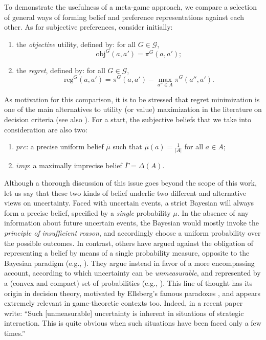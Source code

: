 \documentclass[fleqn,reqno,12pt]{article}
\theoremstyle{Satz}
\theoremstyle{Bsp}
\begin{document}
To demonstrate the usefulness of a meta-game approach, we compare a
selection of general ways of forming belief and preference representations against each
other. As for subjective preferences, consider initially:
\begin{enumerate}
\item the \textit{objective} utility, defined by: for all $G \in \mathcal{G}$,
$$\text{obj}^G(a,a')=\pi^G(a,a');$$
\item the \textit{regret}, defined by: for all $G \in \mathcal{G}$,
$$\text{reg}^G(a,a') =\pi^G(a,a')- \max_{a''\in A} \pi^G(a'',a').$$
\end{enumerate}

As motivation for this comparison, it is to be stressed that regret minimization is one of the main alternatives to utility (or value) maximization in the literature on decision criteria (see also \cite{bleWakker15}).
For a start, the subjective beliefs that we take into consideration are also two:
\begin{enumerate}
\item $prc$: a precise uniform belief $\overline{\mu}$ such that $\overline{\mu}(a)=\frac{1}{|A|}$ for all $a\in A$;
\item $imp$: a maximally imprecise belief $\overline{\Gamma}=\Delta(A)$.
\end{enumerate}

Although a thorough discussion of this issue goes beyond the scope of this work, let us say
that these two kinds of belief underlie two different and alternative views on
uncertainty. Faced with uncertain events, a strict Bayesian will always form a precise belief,
specified by a \textit{single} probability $\mu$. In the absence of any information about
future uncertain events, the Bayesian would mostly invoke the \textit{principle of insufficient
  reason}, and accordingly choose a uniform probability over the possible outcomes. In
contrast, others have argued against the obligation of representing a belief by means of a
single probability measure, opposite to the Bayesian paradigm (e.g., \cite{GilbMarin13}). They
argue instead in favor of a more encompassing account, according to which uncertainty can be
\emph{unmeasurable}, and represented by a (convex and compact) set of probabilities (e.g.,
\cite{gilsch89}). This line of thought has its origin in decision theory, motivated by
Ellsberg's famous paradoxes \citep{ells61}, and appears extremely relevant in game-theoretic
contexts too. Indeed, in a recent paper \citet{BattCerrMM15} write: ``Such [unmeasurable] uncertainty is inherent in situations of strategic interaction. This is quite obvious
  when such situations have been faced only a few times.''
\end{document}

